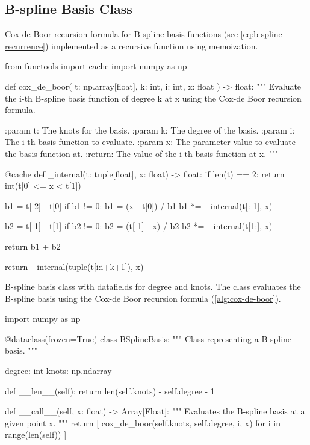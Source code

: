 \subsection{B-spline Basis Class}

\begin{algorithm}
    \caption{Cox-de Boor recursion formula for B-spline basis functions (see \cref{eq:b-spline-recurrence}) implemented as a recursive function using memoization.}
    \label{alg:cox-de-boor}
    \begin{python}
    from functools import cache
    import numpy as np
    
    def cox_de_boor(
        t: np.array[float], k: int, i: int, x: float
    ) -> float:
        """
        Evaluate the i-th B-spline basis function of degree k at x
        using the Cox-de Boor recursion formula.
    
        :param t: The knots for the basis.
        :param k: The degree of the basis.
        :param i: The i-th basis function to evaluate.
        :param x: The parameter value to evaluate the basis function at.
        :return: The value of the i-th basis function at x.
        """
    
        @cache
        def _internal(t: tuple[float], x: float) -> float:
            if len(t) == 2:
                return int(t[0] <= x < t[1])
    
            b1 = t[-2] - t[0]
            if b1 != 0:
                b1 = (x - t[0]) / b1
                b1 *= _internal(t[:-1], x)
    
            b2 = t[-1] - t[1]
            if b2 != 0:
                b2 = (t[-1] - x) / b2
                b2 *= _internal(t[1:], x)
    
            return b1 + b2
    
        return _internal(tuple(t[i:i+k+1]), x)    
    
    \end{python}
    \end{algorithm}




\begin{algorithm}
\caption{B-spline basis class with datafields for degree and knots. The class evaluates the B-spline basis using the Cox-de Boor recursion formula (\cref{alg:cox-de-boor}).}
\label{alg:b-spline-class}
\begin{python}
import numpy as np

@dataclass(frozen=True)
class BSplineBasis:
    """
    Class representing a B-spline basis.
    """

    degree: int
    knots: np.ndarray

    def __len__(self):
        return len(self.knots) - self.degree - 1

    def __call__(self, x: float) -> Array[Float]:
        """
        Evaluates the B-spline basis at a given point x.
        """
        return [
            cox_de_boor(self.knots, self.degree, i, x)
            for i in range(len(self))
        ]

\end{python}
\end{algorithm}


